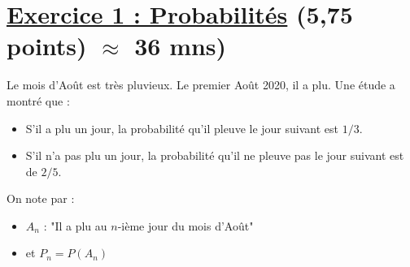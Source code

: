\documentclass[12pt,a4paper]{article}
\begin{document}
\renewcommand{\arraystretch}{1.5}
\renewcommand{\arrayrulewidth}{1.2pt}
\vspace{3cm}

\section*{\underline{Exercice 1 : Probabilités} (5,75 points) $\approx$ 36 mns)}

Le mois d'Août est très pluvieux. Le premier Août 2020, il a plu. Une étude a montré que :
\begin{itemize}
    \item S'il a plu un jour, la probabilité qu'il pleuve le jour suivant est $1/3$.
    \item S'il n'a pas plu un jour, la probabilité qu'il ne pleuve pas le jour suivant est de $2/5$.
\end{itemize}

On note par :
\begin{itemize}
    \item $A_n$ : "Il a plu au $n$-ième jour du mois d'Août"
    \item et $P_n = P(A_n)$
\end{itemize}
\end{document}
